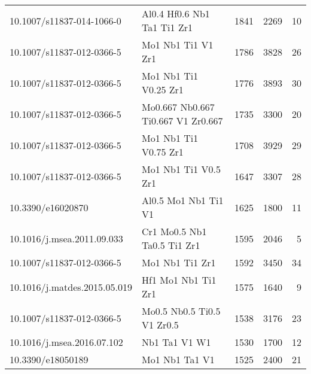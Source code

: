 \begin{tabular}{llrrr}
     10.1007/s11837-014-1066-0 &                  Al0.4 Hf0.6 Nb1 Ta1 Ti1 Zr1 &                1841 &                 2269 &                        10 \\
     10.1007/s11837-012-0366-5 &                           Mo1 Nb1 Ti1 V1 Zr1 &                1786 &                 3828 &                        26 \\
     10.1007/s11837-012-0366-5 &                        Mo1 Nb1 Ti1 V0.25 Zr1 &                1776 &                 3893 &                        30 \\
     10.1007/s11837-012-0366-5 &           Mo0.667 Nb0.667 Ti0.667 V1 Zr0.667 &                1735 &                 3300 &                        20 \\
     10.1007/s11837-012-0366-5 &                        Mo1 Nb1 Ti1 V0.75 Zr1 &                1708 &                 3929 &                        29 \\
     10.1007/s11837-012-0366-5 &                         Mo1 Nb1 Ti1 V0.5 Zr1 &                1647 &                 3307 &                        28 \\
             10.3390/e16020870 &                         Al0.5 Mo1 Nb1 Ti1 V1 &                1625 &                 1800 &                        11 \\
    10.1016/j.msea.2011.09.033 &                  Cr1 Mo0.5 Nb1 Ta0.5 Ti1 Zr1 &                1595 &                 2046 &                         5 \\
     10.1007/s11837-012-0366-5 &                              Mo1 Nb1 Ti1 Zr1 &                1592 &                 3450 &                        34 \\
  10.1016/j.matdes.2015.05.019 &                          Hf1 Mo1 Nb1 Ti1 Zr1 &                1575 &                 1640 &                         9 \\
     10.1007/s11837-012-0366-5 &                   Mo0.5 Nb0.5 Ti0.5 V1 Zr0.5 &                1538 &                 3176 &                        23 \\
    10.1016/j.msea.2016.07.102 &                                Nb1 Ta1 V1 W1 &                1530 &                 1700 &                        12 \\
             10.3390/e18050189 &                               Mo1 Nb1 Ta1 V1 &                1525 &                 2400 &                        21 \\
\bottomrule
\end{tabular}
